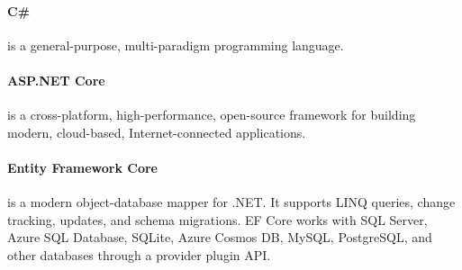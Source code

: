 \paragraph{C\#}
is a general-purpose, multi-paradigm programming language.
\paragraph{ASP.NET Core}
is a cross-platform, high-performance, open-source framework for building modern, cloud-based, Internet-connected applications.
\paragraph{Entity Framework Core}
is a modern object-database mapper for .NET.
It supports LINQ queries, change tracking, updates, and schema migrations.
EF Core works with SQL Server, Azure SQL Database, SQLite, Azure Cosmos DB, MySQL, PostgreSQL, and other databases through a provider plugin API.
